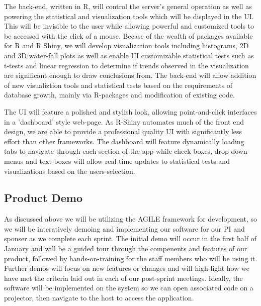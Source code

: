\documentclass[10pt,twocolumn,letterpaper]{article}
\begin{document}
            The back-end, written in R, will control the server's general operation as well as powering the statistical and visualization tools which will be displayed in the UI. This will be invisible to the user while allowing powerful and customized tools to be accessed with the click of a mouse. Becase of the wealth of packages available for R and R Shiny, we will develop visualization tools including histograms, 2D and 3D water-fall plots as well as enable UI customizable statistical tests such as t-tests and linear regression to determine if trends observed in the visualization are significant enough to draw conclusions from. The back-end will allow addition of new visualiztion tools and statistical tests based on the requirements of database growth, mainly via R-packages and modification of existing code.


            The UI will feature a polished and stylish look, allowing point-and-click interfaces in a 'dashboard' style web-page. As R-Shiny automates much of the front end design, we are able to provide a professional quality UI with significantly less effort than other frameworks. The dashboard will feature dynamically loading tabs to navigate through each section of the app while check-boxes, drop-down menus and text-boxes will allow real-time updates to statistical tests and visualizations based on the users-selection.

            \subsection{Product Demo}

            As discussed above we will be utilizing the AGILE framework for development, so we will be interatively demoing and implementing our software for our PI and sponser as we complete each sprint. The initial demo will occur in the first half of January and will be a guided tour through the compenents and features of our product, followed by hands-on-training for the staff members who will be using it. Further demos will focus on new features or changes and will high-light how we have met the criteria laid out in each of our post-sprint meetings. Ideally, the software will be implemented on the system so we can open associated code on a projector, then navigate to the host to access the application.
\end{document}
